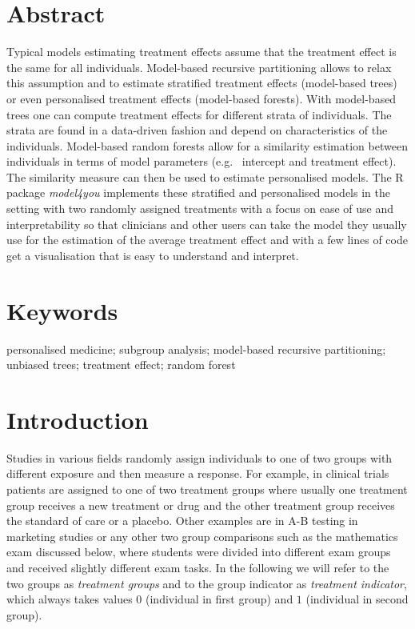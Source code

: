 \documentclass{josr}\usepackage[]{graphicx}\usepackage[]{color}
\newcommand{\new}[1]{{\color{blue} #1}}
\begin{document}
\section*{Abstract}
Typical models estimating treatment effects assume that the treatment effect is
the same for all individuals.  Model-based recursive partitioning allows to
relax this assumption and to estimate stratified treatment effects (model-based
trees) or even personalised treatment effects (model-based forests).  With
model-based trees one can compute treatment effects for different strata of
individuals. The strata are found in a data-driven fashion and depend on
characteristics of the individuals.  Model-based random forests allow for a
similarity estimation between individuals in terms of model parameters (e.g.~
intercept and treatment effect). The similarity measure can then be used to
estimate personalised models.  The R package \emph{model4you} implements these
stratified and personalised models \new{in the setting with two randomly
assigned treatments} with a focus on ease of use and interpretability so that
clinicians and other users can take the model they usually use for the
estimation of the average treatment effect and with a few lines of code get a
visualisation that is easy to understand and interpret.


\section*{Keywords}

personalised medicine; subgroup analysis; model-based recursive partitioning;
unbiased trees; treatment effect; random forest


\section*{Introduction}

Studies in various fields randomly assign individuals to one of two groups with
different exposure and then measure a response. For example, in clinical trials
patients are assigned to one of two treatment groups where usually one
treatment group receives a new treatment or drug and the other treatment group
receives the standard of care or a placebo. Other examples are in A-B testing
in marketing studies or any other two group comparisons such as the mathematics
exam discussed below, where students were divided into different exam groups
and received slightly different exam tasks. In the following we will refer to
the two groups as \emph{treatment groups} and to the group indicator as
\emph{treatment indicator}, which always takes values $0$ (individual in first
group) and $1$ (individual in second group).
\end{document}
